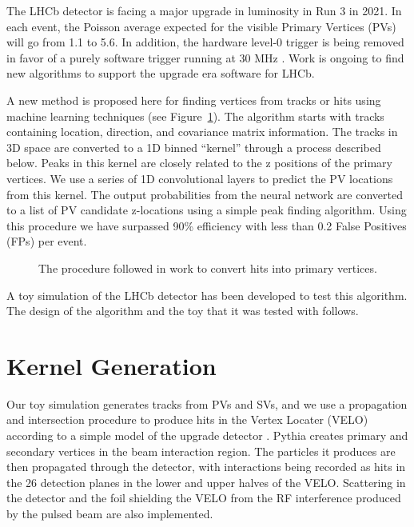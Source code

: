 \documentclass[10pt, paper=a4, UKenglish]{article}
\begin{document}

The LHCb detector is facing a major upgrade in luminosity in Run 3 in 2021. In each event, the Poisson average expected for the visible Primary Vertices (PVs) will go from 1.1 to 5.6. In addition, the hardware level-0 trigger is being removed in favor of a purely software trigger running at 30 MHz \cite{CERN-LHCC-2014-016}. Work is ongoing to find new algorithms to support the upgrade era software for LHCb.

A new method is proposed here for finding vertices from tracks or hits using machine learning techniques (see Figure~\ref{fig:approach}). The algorithm starts with tracks containing location, direction, and covariance matrix information. The tracks in 3D space are converted to a 1D binned ``kernel'' through a process described below. Peaks in this kernel are closely related to the z positions of the primary vertices. We use a series of 1D convolutional layers to predict the PV locations from this kernel. The output probabilities from the neural network are converted to a list of PV candidate z-locations using a simple peak finding algorithm. Using this procedure we have surpassed 90\% efficiency with less than 0.2 False Positives (FPs) per event.


\begin{figure}[!htb]
	\centering
	
	\caption{The procedure followed in work to convert hits into primary vertices.}
	\label{fig:approach}
\end{figure}

A toy simulation of the LHCb detector has been developed to test this algorithm. The design of the algorithm and the toy that it was tested with follows.

\section{Kernel Generation}

Our toy simulation generates tracks from PVs and SVs, and we use a propagation and intersection procedure to produce hits in the Vertex Locater (VELO) according to a simple model of the upgrade detector \cite{Collaboration:1624070}. Pythia \cite{Sjostrand:2006za, Sjostrand:2007gs} creates primary and secondary vertices in the beam interaction region. The particles it produces are then propagated through the detector, with interactions being recorded as hits in the 26 detection planes in the lower and upper halves of the VELO. Scattering in the detector and the foil shielding the VELO from the RF interference produced by the pulsed beam \cite{Collaboration:1624070} are also implemented.
\end{document}
